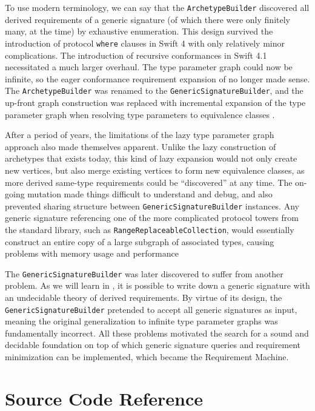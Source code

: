 \documentclass[../generics]{subfiles}
\begin{document}
To use modern terminology, we can say that the \texttt{ArchetypeBuilder} discovered all derived requirements of a generic signature (of which there were only finitely many, at the time) by exhaustive enumeration. This design survived the introduction of protocol \texttt{where} clauses in Swift 4 with only relatively minor complications. The introduction of recursive conformances in Swift 4.1 necessitated a much larger overhaul. The type parameter graph could now be infinite, so the eager conformance requirement expansion of  no longer made sense. The \texttt{ArchetypeBuilder} was renamed to the \texttt{GenericSignatureBuilder}, and the up-front graph construction was replaced with incremental expansion of the type parameter graph when resolving type parameters to equivalence classes \cite{implrecursive}.

After a period of years, the limitations of the lazy type parameter graph approach also made themselves apparent. Unlike the lazy construction of archetypes that exists today, this kind of lazy expansion would not only create new vertices, but also merge existing vertices to form new equivalence classes, as more derived same-type requirements could be ``discovered'' at any time. The on-going mutation made things difficult to understand and debug, and also prevented sharing structure between \texttt{GenericSignatureBuilder} instances. Any generic signature referencing one of the more complicated protocol towers from the standard library, such as \texttt{RangeReplaceableCollection}, would essentially construct an entire copy of a large subgraph of associated types, causing problems with memory usage and performance

The \texttt{GenericSignatureBuilder} was later discovered to suffer from another problem. As we will learn in , it is possible to write down a generic signature with an undecidable theory of derived requirements. By virtue of its design, the \texttt{GenericSignatureBuilder} pretended to accept all generic signatures as input, meaning the original generalization to infinite type parameter graphs was fundamentally incorrect. All these problems motivated the search for a sound and decidable foundation on top of which generic signature queries and requirement minimization can be implemented, which became the Requirement Machine.

\section{Source Code Reference}
\end{document}
